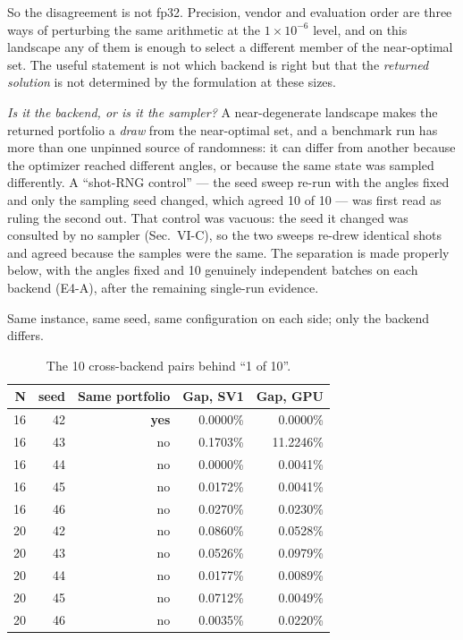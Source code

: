 \documentclass[journal]{IEEEtran}
\begin{document}
So the disagreement is not fp32. Precision, vendor and evaluation order are three ways of perturbing the same arithmetic at the $1\times 10^{-6}$ level, and on this landscape any of them is enough to select a different member of the near-optimal set. The useful statement is not which backend is right but that the \textit{returned solution} is not determined by the formulation at these sizes.


\textit{Is it the backend, or is it the sampler?} A near-degenerate landscape makes the returned portfolio a \textit{draw} from the near-optimal set, and a benchmark run has more than one unpinned source of randomness: it can differ from another because the optimizer reached different angles, or because the same state was sampled differently. A ``shot-RNG control'' --- the seed sweep re-run with the angles fixed and only the sampling seed changed, which agreed 10 of 10 --- was first read as ruling the second out. That control was vacuous: the seed it changed was consulted by no sampler (Sec.~VI-C), so the two sweeps re-drew identical shots and agreed because the samples were the same. The separation is made properly below, with the angles fixed and 10 genuinely independent batches on each backend (E4-A), after the remaining single-run evidence.


Same instance, same seed, same configuration on each side; only the backend differs.


\begin{table}[!t]
\centering
\scriptsize
\caption{The 10 cross-backend pairs behind ``1 of 10''.}
\label{tab:S27}
\begin{tabular}{rrrrr}
\toprule
N & seed & Same portfolio & Gap, SV1 & Gap, GPU \\
\midrule
16 & 42 & \textbf{yes} & 0.0000\% & 0.0000\% \\
16 & 43 & no & 0.1703\% & 11.2246\% \\
16 & 44 & no & 0.0000\% & 0.0041\% \\
16 & 45 & no & 0.0172\% & 0.0041\% \\
16 & 46 & no & 0.0270\% & 0.0230\% \\
20 & 42 & no & 0.0860\% & 0.0528\% \\
20 & 43 & no & 0.0526\% & 0.0979\% \\
20 & 44 & no & 0.0177\% & 0.0089\% \\
20 & 45 & no & 0.0712\% & 0.0049\% \\
20 & 46 & no & 0.0035\% & 0.0220\% \\
\bottomrule
\end{tabular}
\end{table}
\end{document}
